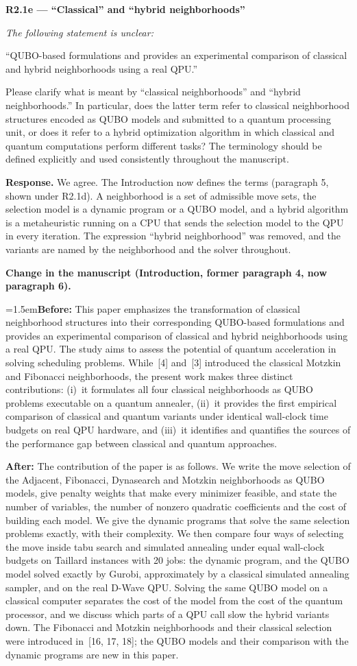 \documentclass[12pt]{article}
\newenvironment{rc}[1]{\par\medskip\noindent\textbf{#1}\par\nopagebreak\noindent\itshape\renewcommand{\emph}[1]{\textbf{##1}}\ignorespaces}{\par}
\newcommand{\answer}[1]{\par\smallskip\noindent\textbf{Response.} #1\par}
\newcommand{\change}[3]{\par\smallskip\noindent\textbf{Change in the manuscript (#1).}\par
  {\leftskip=1.5em\noindent\textbf{Before:} #2\par\noindent\textbf{After:} #3\par}}
\begin{document}
\begin{rc}{R2.1e --- ``Classical'' and ``hybrid neighborhoods''}
The following statement is unclear:

``QUBO-based formulations and provides an experimental comparison of classical and hybrid neighborhoods using a real QPU.''

Please clarify what is meant by ``classical neighborhoods'' and ``hybrid neighborhoods.'' In particular, does the latter term refer to classical neighborhood structures encoded as QUBO models and submitted to a quantum processing unit, or does it refer to a hybrid optimization algorithm in which classical and quantum computations perform different tasks? The terminology should be defined explicitly and used consistently throughout the manuscript.
\end{rc}
\answer{We agree. The Introduction now defines the terms (paragraph 5, shown under R2.1d). A neighborhood is a set of admissible move sets, the selection model is a dynamic program or a QUBO model, and a hybrid algorithm is a metaheuristic running on a CPU that sends the selection model to the QPU in every iteration. The expression ``hybrid neighborhood'' was removed, and the variants are named by the neighborhood and the solver throughout.}
\change{Introduction, former paragraph 4, now paragraph 6}{This paper emphasizes the transformation of classical neighborhood structures into their corresponding QUBO-based formulations and provides an experimental comparison of classical and hybrid neighborhoods using a real QPU. The study aims to assess the potential of quantum acceleration in solving scheduling problems. While~[4] and~[3] introduced the classical Motzkin and Fibonacci neighborhoods, the present work makes three distinct contributions: (i)~it formulates all four classical neighborhoods as QUBO problems executable on a quantum annealer, (ii)~it provides the first empirical comparison of classical and quantum variants under identical wall-clock time budgets on real QPU hardware, and (iii)~it identifies and quantifies the sources of the performance gap between classical and quantum approaches.}{The contribution of the paper is as follows. We write the move selection of the Adjacent, Fibonacci, Dynasearch and Motzkin neighborhoods as QUBO models, give penalty weights that make every minimizer feasible, and state the number of variables, the number of nonzero quadratic coefficients and the cost of building each model. We give the dynamic programs that solve the same selection problems exactly, with their complexity. We then compare four ways of selecting the move inside tabu search and simulated annealing under equal wall-clock budgets on Taillard instances with 20 jobs: the dynamic program, and the QUBO model solved exactly by Gurobi, approximately by a classical simulated annealing sampler, and on the real D-Wave QPU. Solving the same QUBO model on a classical computer separates the cost of the model from the cost of the quantum processor, and we discuss which parts of a QPU call slow the hybrid variants down. The Fibonacci and Motzkin neighborhoods and their classical selection were introduced in~[16, 17, 18]; the QUBO models and their comparison with the dynamic programs are new in this paper.}
\end{document}
